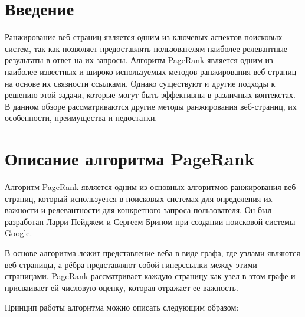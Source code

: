 \documentclass[a4paper]{article}
\begin{document}
	\thispagestyle{empty}
	
	
		
	\newpage
		
	\tableofcontents
	
	\pagestyle{plain}
	
	\newpage
	
	\section{Введение}
	
	Ранжирование веб-страниц является одним из ключевых аспектов поисковых систем, так как позволяет предоставлять пользователям наиболее релевантные результаты в ответ на их запросы. Алгоритм PageRank является одним из наиболее известных и широко используемых методов ранжирования веб-страниц на основе их связности ссылками. Однако существуют и другие подходы к решению этой задачи, которые могут быть эффективны в различных контекстах. В данном обзоре рассматриваются другие методы ранжирования веб-страниц, их особенности, преимущества и недостатки.
	
\section{Описание алгоритма PageRank}

Алгоритм PageRank является одним из основных алгоритмов ранжирования веб-страниц, который используется в поисковых системах для определения их важности и релевантности для конкретного запроса пользователя. Он был разработан Ларри Пейджем и Сергеем Брином при создании поисковой системы Google.

В основе алгоритма лежит представление веба в виде графа, где узлами являются веб-страницы, а рёбра представляют собой гиперссылки между этими страницами. PageRank рассматривает каждую страницу как узел в этом графе и присваивает ей числовую оценку, которая отражает ее важность.

Принцип работы алгоритма можно описать следующим образом:
\end{document}
